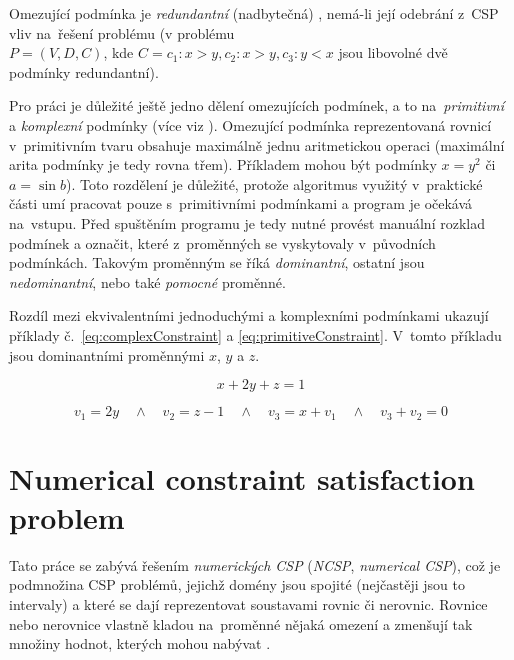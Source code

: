 Omezující podmínka je \emph{redundantní} (nadbytečná) {\cite[s.~20]{Vu2005}}, nemá-li její odebrání z~CSP vliv na~řešení problému (v problému \\ $P = (V, D, C)$, kde $C = {c_1: x > y, c_2: x > y, c_3: y < x}$ jsou libovolné dvě podmínky redundantní).

Pro práci je důležité ještě jedno dělení omezujících podmínek, a to na~\emph{primitivní} a \emph{komplexní} podmínky (více viz \cite{kue12}). Omezující podmínka reprezentovaná rovnicí v~primitivním tvaru obsahuje maximálně jednu aritmetickou operaci (maximální arita podmínky je tedy rovna třem). Příkladem mohou být podmínky $x = y^2$ či $a = \sin b$). Toto rozdělení je důležité, protože algoritmus využitý v~praktické části umí pracovat pouze s~primitivními podmínkami a program je očekává na~vstupu. Před spuštěním programu je tedy nutné provést manuální rozklad podmínek a označit, které z~proměnných se vyskytovaly v~původních podmínkách. Takovým proměnným se říká \emph{dominantní}, ostatní jsou \emph{nedominantní}, nebo také \emph{pomocné} proměnné.

Rozdíl mezi ekvivalentními jednoduchými a komplexními podmínkami ukazují příklady č.~\ref{eq:complexConstraint} a \ref{eq:primitiveConstraint}. V~tomto příkladu jsou dominantními proměnnými $x$, $y$ a $z$.

\begin{equation} \label{eq:complexConstraint}
x + 2y + z = 1
\end{equation}

\begin{equation} \label{eq:primitiveConstraint}
v_1 = 2y \quad \wedge \quad v_2 = z - 1 \quad \wedge \quad v_3 = x + v_1 \quad \wedge \quad v_3 + v_2 = 0
\end{equation}





\section{Numerical constraint satisfaction problem}
\label{ch:ncsp}

Tato práce se zabývá řešením \emph{numerických CSP} (\emph{NCSP}, \emph{numerical CSP}), což je podmnožina CSP problémů, jejichž domény jsou spojité (nejčastěji jsou to intervaly) a které se dají reprezentovat soustavami rovnic či nerovnic. Rovnice nebo nerovnice vlastně kladou na~proměnné nějaká omezení a zmenšují tak množiny hodnot, kterých mohou nabývat \cite{rueherDependency}.

